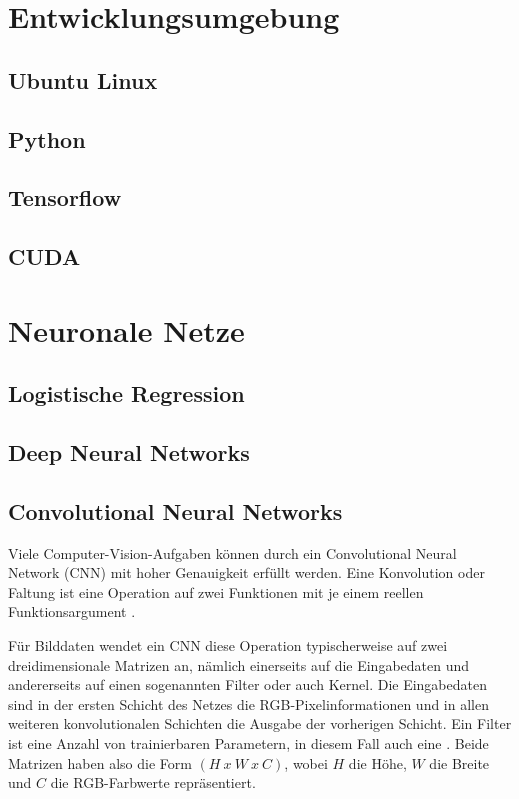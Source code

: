 \chapter{Entwicklungsumgebung}
\label{ch:latex}

\section{Ubuntu Linux}
\label{sec:ubuntu}

\section{Python}
\label{sec:python}

\section{Tensorflow}
\label{sec:tensorflow}

\section{CUDA}
\label{sec:cuda}

\chapter{Neuronale Netze}
\label{ch:neuralnets}

\section{Logistische Regression}
\label{sec:logreg}

\section{Deep Neural Networks}
\label{sec:dnn}

\section{Convolutional Neural Networks}
\label{sec:cnn}
Viele Computer-Vision-Aufgaben können durch ein Convolutional Neural Network (CNN) mit hoher Genauigkeit erfüllt werden. Eine Konvolution oder Faltung ist eine Operation auf zwei Funktionen mit je einem reellen Funktionsargument \mbox{\cite[S.~327-329]{Goodfellow-et-al-2016}}.

Für Bilddaten wendet ein CNN diese Operation typischerweise auf zwei dreidimensionale Matrizen an, nämlich einerseits auf die Eingabedaten und andererseits auf einen sogenannten Filter oder auch Kernel. Die Eingabedaten sind in der ersten Schicht des Netzes die RGB-Pixelinformationen und in allen weiteren konvolutionalen Schichten die Ausgabe der vorherigen Schicht. Ein Filter ist eine Anzahl von trainierbaren Parametern, in diesem Fall auch eine . Beide Matrizen haben also die Form $(H\ x\ W\ x\ C)$, wobei $H$ die Höhe, $W$ die Breite und $C$ die RGB-Farbwerte repräsentiert.


